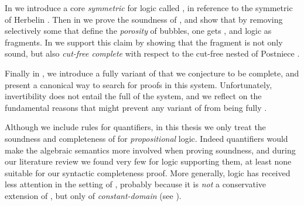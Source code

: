 \begin{scope}
\AP
In  we introduce a core \emph{symmetric } for  logic called , in reference to the
symmetric  of Herbelin . Then
in  we prove the soundness of , and show
that by removing selectively some  that define the
\emph{porosity} of  bubbles, one gets ,
 and  logic as fragments. In
 we support this claim by showing that the
 fragment is not only sound, but also \emph{cut-free
complete} with respect to the cut-free nested 
 of Postniece .

Finally in , we introduce a fully 
variant of  that we conjecture to be complete, and present a
canonical way to search for proofs in this system. Unfortunately, invertibility
does not entail the full  of the system, and we reflect on the
fundamental reasons that might prevent any variant of  from being
fully .


\begin{kaonote}
  Although we include rules for quantifiers, in this thesis we only treat the
soundness and completeness of  for \emph{propositional}
logic. Indeed quantifiers would make the algebraic semantics more involved when
proving soundness, and during our literature review we found very few  for  logic supporting them, at least none
suitable for our syntactic completeness proof. More generally,
 logic has received less attention in the setting of
, probably because it is \emph{not} a conservative extension of
 , but only of \emph{constant-domain}
  (see
\cite{crolard_subtractive_2001,aschieri_natural_2018}).
\end{kaonote}


\end{scope}
